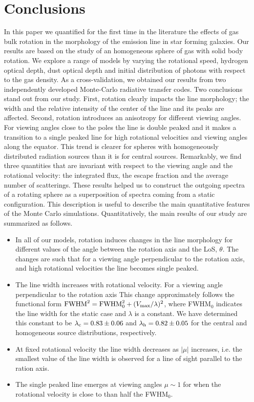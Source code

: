 \section{Conclusions}
\label{sec:conclusions}
In this paper we quantified for the first time in the literature the effects
of gas bulk rotation in the morphology of the \ly emission line in
star forming galaxies.
Our results are based on the study of an homogeneous sphere
of gas with solid body rotation.
We explore a range of models by varying the rotational speed, hydrogen
optical depth, dust optical depth and initial distribution of \ly
photons with respect to the gas density.
As a cross-validation, we obtained our results from two independently
developed Monte-Carlo radiative transfer codes.
Two conclusions stand out from our study.
First, rotation clearly impacts the \ly line morphology; the width and
the relative intensity of the center of the line and its peaks are
affected.
Second, rotation introduces an anisotropy for different viewing
angles.
For viewing angles close to the poles the line is double peaked and it
makes a transition to a single peaked line for high rotational
velocities and viewing angles along the equator.
This trend is clearer for spheres with homogeneously distributed
radiation sources than it is for central sources.
Remarkably, we find three quantities that are invariant with respect
to the viewing angle and the rotational velocity: the integrated flux,
the escape fraction and the average number of scatterings.
These results helped us to construct the outgoing spectra of a
rotating sphere as a superposition of spectra coming from a static
configuration. This description is useful to describe the main
quantitative features of the Monte Carlo simulations.
Quantitatively, the main results of our study are summarized as
follows.
\begin{itemize}
\item In all of our models, rotation induces changes in the line morphology
for different values of the angle between the rotation
axis and the LoS, $\theta$. The changes are such that for
a viewing angle perpendicular to the
rotation axis, and high rotational velocities the line becomes single peaked.
\item The line width increases with rotational
velocity. For a viewing angle perpendicular to the rotation axis
This change approximately follows the functional form ${\rm FWHM}^2
= {\rm FWHM}_{ 0}^2 + (V_{\rm max}/\lambda)^2$, where FWHM$_{0}$
indicates the line
width for the static case and $\lambda$ is a constant. We have
determined this constant to be $\lambda_{\rm c}=0.83 \pm 0.06$ and
$\lambda_{\rm h}=0.82\pm 0.05$ for the central and homogeneous source
distributions, respectively.
\item At fixed rotational velocity the line width decreases as $|\mu|$
increases, i.e. the smallest value of the line width is observed for
a line of sight parallel to the ration axis.
\item The single peaked line emerges at viewing angles $\mu\sim 1$ for
when the rotational velocity is close to than half the FWHM$_0$.
\end{itemize}
